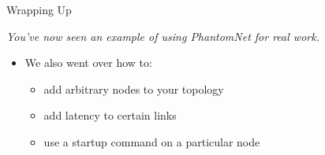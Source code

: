 \documentclass[xcolor=pdftex,dvipsnames,table]{beamer}
\begin{document}
\begin{frame}{Wrapping Up}
  \centerline{\emph{You've now seen an example of using PhantomNet for real work.}}
  \vspace{0.1in}
  \begin{itemize}
  \item We also went over how to:
    \begin{itemize}
    \item add arbitrary nodes to your topology
    \item add latency to certain links
    \item use a startup command on a particular node
    \end{itemize}
  \end{itemize}
\end{frame}
\end{document}
